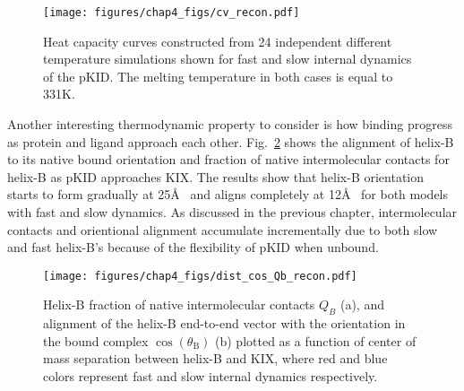 \documentclass[../talant.diss.submit.tex]{subfiles}
\begin{document}
\begin{figure}[htp!]
  \begin{centering}                                                                                         
    \texttt{[image: figures/chap4\_figs/cv\_recon.pdf]}
    \caption{Heat capacity curves constructed from 24 independent different temperature
      simulations shown for fast and slow internal dynamics of the pKID. The melting
      temperature in both cases is equal to 331K.}                    
    \label{fig:cv_recon}                                                                                   
  \end{centering}                                                                                           
\end{figure}                                                                                                
%                   
%


Another interesting thermodynamic property to consider is how binding progress as protein and ligand
approach each other. Fig.~\ref{fig:dist_cos_Qb_recon} shows the alignment of helix-B to its
native bound orientation and fraction of native intermolecular
contacts for helix-B as pKID approaches KIX. The results show that helix-B
orientation starts to form gradually at 25\AA~ and aligns completely at
12\AA~ for both models with fast and slow dynamics. As discussed in the previous chapter,
intermolecular contacts and orientional alignment accumulate incrementally due to both slow
and fast helix-B's because of the flexibility of pKID when unbound.

\begin{figure}[htp!]
  \begin{centering}                                                                                         
    \texttt{[image: figures/chap4\_figs/dist\_cos\_Qb\_recon.pdf]}
    \caption{Helix-B fraction of native intermolecular contacts $Q_B$ (a),
      and alignment of the helix-B end-to-end vector with the orientation
      in the bound complex $\cos(\theta_\mathrm{B})$ (b) plotted as a function
      of center of mass separation between helix-B and KIX, where red and blue
      colors represent fast and slow internal dynamics respectively.}                    
    \label{fig:dist_cos_Qb_recon}                                                                                 
  \end{centering}                                                                                           
\end{figure}                                                                                                
\end{document}
